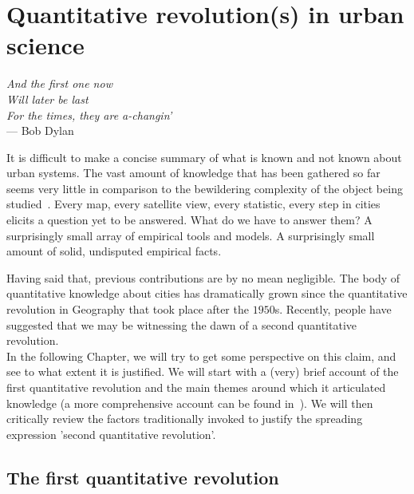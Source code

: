 

\chapter{Quantitative revolution(s) in urban science}
\label{chap:quantitative_revolutions}

\begin{flushright}{\slshape    
And the first one now\\
Will later be last\\
For the times, they are a-changin'} \\ \medskip
--- Bob Dylan 
\end{flushright}


\bigskip


It is difficult to make a concise summary of what is known and not known about
urban systems. The vast amount of knowledge that has been gathered so far seems
very little in comparison to the bewildering complexity of the object being
studied~\cite{Batty:2008}. Every map, every satellite view, every statistic, every step
in cities elicits a question yet to be answered. What do we have to answer them?
A surprisingly small array of empirical tools and models. A surprisingly small
amount of solid, undisputed empirical facts.

Having said that, previous contributions are by no mean negligible. The body of
quantitative knowledge about cities has dramatically grown since the
quantitative revolution in Geography that took place after the $1950$s.
Recently, people have suggested that we may be witnessing the dawn of a second
quantitative revolution.\\

In the following Chapter, we will try to get some perspective on this claim, and
see to what extent it is justified. We will start with a (very) brief account of the
first quantitative revolution and the main themes around which it articulated
knowledge (a more comprehensive account can be found in~\cite{Sanders:2011}). We
will then critically review the factors traditionally invoked to justify the
spreading expression 'second quantitative revolution'.



\section{The first quantitative revolution}
\label{sec:the_first_quantitative_revolution}

